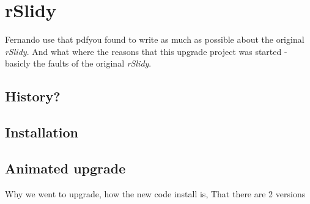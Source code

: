 %
%
% 
% 
% 


\chapter{rSlidy}

\label{chap:rslidy}

Fernando use that pdfyou found to write as much as possible about the original \textit{rSlidy}. And what where the reasons that this upgrade project was started - basicly the faults of the original \textit{rSlidy}.

\section{History?} %
\label{sec:history}


\section{Installation} %
\label{sec:installation}


\section{Animated upgrade} %
\label{sec:}

Why we went to upgrade,
how the new code install is,
That there are 2 versions

